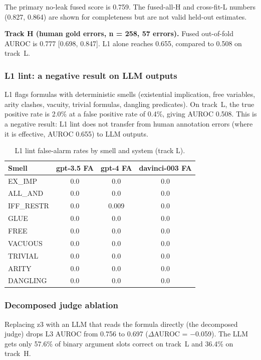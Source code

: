 \documentclass[11pt,letterpaper]{article}
\begin{document}
The primary no-leak fused score is 0.759. The fused-all-H and cross-fit-L numbers (0.827, 0.864) are shown for completeness but are not valid held-out estimates.

\textbf{Track H (human gold errors, n = 258, 57 errors).} Fused out-of-fold AUROC is 0.777 [0.698, 0.847]. L1 alone reaches 0.655, compared to 0.508 on track~L.

\subsubsection{L1 lint: a negative result on LLM outputs}

L1 flags formulas with deterministic smells (existential implication, free variables, arity clashes, vacuity, trivial formulas, dangling predicates). On track~L, the true positive rate is 2.0\% at a false positive rate of 0.4\%, giving AUROC 0.508. This is a negative result: L1 lint does not transfer from human annotation errors (where it is effective, AUROC 0.655) to LLM outputs.

\begin{table}[!htbp]
\centering
\caption{L1 lint false-alarm rates by smell and system (track L).}
\label{tab:l1_fa}
\begin{tabular}{lccc}
\toprule
Smell & gpt-3.5 FA & gpt-4 FA & davinci-003 FA \\
\midrule
EX\_IMP & 0.0 & 0.0 & 0.0 \\
ALL\_AND & 0.0 & 0.0 & 0.0 \\
IFF\_RESTR & 0.0 & 0.009 & 0.0 \\
GLUE & 0.0 & 0.0 & 0.0 \\
FREE & 0.0 & 0.0 & 0.0 \\
VACUOUS & 0.0 & 0.0 & 0.0 \\
TRIVIAL & 0.0 & 0.0 & 0.0 \\
ARITY & 0.0 & 0.0 & 0.0 \\
DANGLING & 0.0 & 0.0 & 0.0 \\
\bottomrule
\end{tabular}
\end{table}

\subsubsection{Decomposed judge ablation}

Replacing z3 with an LLM that reads the formula directly (the decomposed judge) drops L3 AUROC from 0.756 to 0.697 ($\Delta$AUROC = $-$0.059). The LLM gets only 57.6\% of binary argument slots correct on track~L and 36.4\% on track~H.
\end{document}
